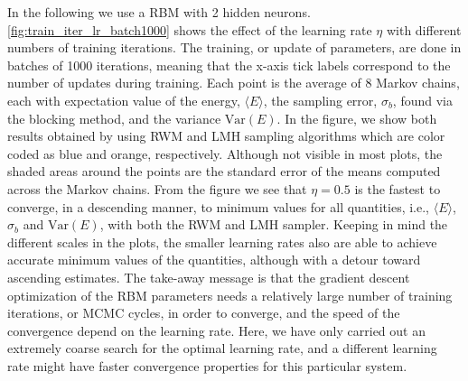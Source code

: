 In the following we use a RBM with 2 hidden neurons. \autoref{fig:train_iter_lr_batch1000} shows the effect of the learning rate $\eta$ with different numbers of training iterations. The training, or update of parameters, are done in batches of 1000 iterations, meaning that the x-axis tick labels correspond to the number of updates during training. Each point is the average of 8 Markov chains, each with expectation value of the energy, $\langle E \rangle$, the sampling error, $\sigma_b$, found via the blocking method, and the variance $\mathrm{Var}(E)$. In the figure, we show both results obtained by using RWM and LMH sampling algorithms which are color coded as blue and orange, respectively. Although not visible in most plots, the shaded areas around the points are the standard error of the means computed across the Markov chains. From the figure we see that $\eta=0.5$ is the fastest to converge, in a descending manner, to minimum values for all quantities, i.e., $\langle E \rangle$, $\sigma_b$ and $\mathrm{Var}(E)$, with both the RWM and LMH sampler. Keeping in mind the different scales in the plots, the smaller learning rates also are able to achieve accurate minimum values of the quantities, although with a detour toward ascending estimates. The take-away message is that the gradient descent optimization of the RBM parameters needs a relatively large number of training iterations, or MCMC cycles, in order to converge, and the speed of the convergence depend on the learning rate. Here, we have only carried out an extremely coarse search for the optimal learning rate, and a different learning rate might have faster convergence properties for this particular system. 

